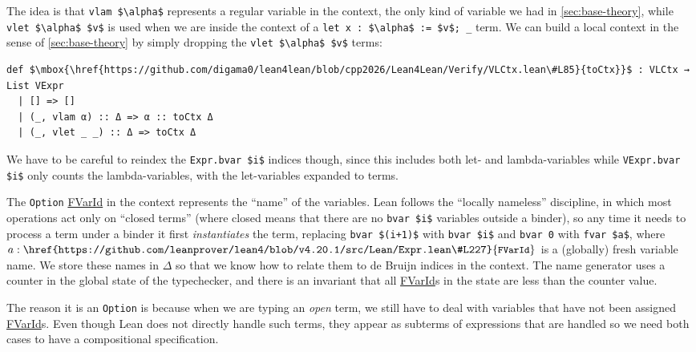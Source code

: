 \documentclass[sigplan,10pt,screen]{acmart}\settopmatter{printfolios=true,printccs=false,printacmref=false}
\newcommand{\code}[1]{\mbox{\ttfamily\small #1}}
\begin{document}
The idea is that \lstinline|vlam $\alpha$| represents a regular variable in the context, the only kind of variable we had in \autoref{sec:base-theory}, while \lstinline|vlet $\alpha$ $v$| is used when we are inside the context of a \lstinline|let x : $\alpha$ := $v$; _| term. We can build a local context in the sense of \autoref{sec:base-theory} by simply dropping the \lstinline|vlet $\alpha$ $v$| terms:

\begin{lstlisting}
def $\mbox{\href{https://github.com/digama0/lean4lean/blob/cpp2026/Lean4Lean/Verify/VLCtx.lean\#L85}{toCtx}}$ : VLCtx → List VExpr
  | [] => []
  | (_, vlam α) :: Δ => α :: toCtx Δ
  | (_, vlet _ _) :: Δ => toCtx Δ
\end{lstlisting}
We have to be careful to reindex the \lstinline|Expr.bvar $i$| indices though, since this includes both let- and lambda-variables while \lstinline|VExpr.bvar $i$| only counts the lambda-variables, with the let-variables expanded to terms.

The \lstinline|Option| \href{https://github.com/leanprover/lean4/blob/v4.20.1/src/Lean/Expr.lean#L227}{\code{FVarId}} in the context represents the ``name'' of the variables. Lean follows the ``locally nameless'' discipline, in which most operations act only on ``closed terms'' (where closed means that there are no \lstinline|bvar $i$| variables outside a binder), so any time it needs to process a term under a binder it first \emph{instantiates} the term, replacing \lstinline|bvar $(i+1)$| with \lstinline|bvar $i$| and \lstinline|bvar 0| with \lstinline|fvar $a$|, where $a:\mbox{\href{https://github.com/leanprover/lean4/blob/v4.20.1/src/Lean/Expr.lean\#L227}{\code{FVarId}}}$ is a (globally) fresh variable name. We store these names in $\Delta$ so that we know how to relate them to de Bruijn indices in the context. The name generator uses a counter in the global state of the typechecker, and there is an invariant that all \href{https://github.com/leanprover/lean4/blob/v4.20.1/src/Lean/Expr.lean#L227}{\code{FVarId}}s in the state are less than the counter value.

The reason it is an \lstinline|Option| is because when we are typing an \emph{open} term, we still have to deal with variables that have not been assigned \href{https://github.com/leanprover/lean4/blob/v4.20.1/src/Lean/Expr.lean#L227}{\code{FVarId}}s. Even though Lean does not directly handle such terms, they appear as subterms of expressions that are handled so we need both cases to have a compositional specification.
\end{document}
